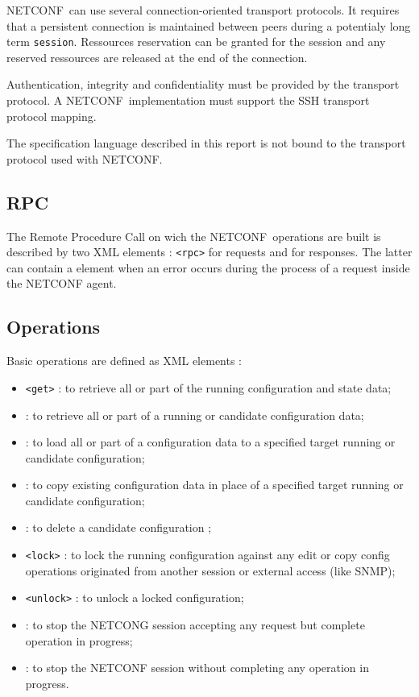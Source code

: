 \documentclass[a4paper]{article}
\newcommand{\nc}{NETCONF}
\begin{document}
\nc\  can  use several  connection-oriented  transport protocols.   It
requires  that a  persistent  connection is  maintained between  peers
during a  potentialy long term {\tt  session}.  Ressources reservation
can  be  granted for  the  session  and  any reserved  ressources  are
released at the end of the connection.

Authentication, integrity and confidentiality  must be provided by the
transport  protocol.  A  \nc\  implementation  must  support  the  SSH
transport protocol mapping.

The specification  language described in  this report is not  bound to
the transport protocol used with NETCONF.

\subsection{RPC}

The Remote  Procedure Call  on wich the  \nc\ operations are  built is
described  by two  XML\cite{Bray:00:EML}  elements :  {\tt <rpc>}  for
requests and {\tt <rpc-reply>}  for responses.  The latter can contain
a {\tt <rpc-error>} element when an error occurs during the process of
a request inside the NETCONF agent.

\subsection{Operations}


Basic operations are defined as XML elements :

\begin{itemize}
\item
{\tt <get>} : to retrieve all or part of the running configuration and
state data;
\item
{\tt <get-config>} : to retrieve all or part of a running or candidate
configuration data;
\item
{\tt <edit-config>} : to load all or part of a configuration data to a
specified target running or candidate configuration;
\item
{\tt <copy-config>} : to copy existing configuration data in place of
a specified target running or candidate configuration;
\item
{\tt <delete-config>} : to delete a candidate configuration ;
\item
{\tt <lock>} :  to lock the running configuration  against any edit or
copy  config operations  originated from  another session  or external
access (like SNMP);
\item
{\tt <unlock>} : to unlock a locked configuration;
\item
{\tt  <close-session>}  : to  stop  the  NETCONG  session accepting  any
request but complete operation in progress;
\item
{\tt <kill-session>} : to stop  the NETCONF session without completing any
operation in progress.
\end{itemize}
\end{document}
